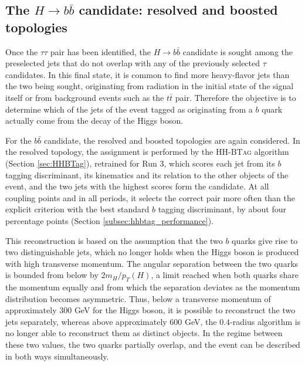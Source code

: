 
\subsection{The \texorpdfstring{$H\to b\bar{b}$}{H->bb} candidate: resolved and boosted topologies}
%
Once the $\tau\tau$ pair has been identified, the $H\to b\bar{b}$ candidate is sought among the preselected jets that do not overlap with any of the previously selected $\tau$ candidates. In this final state, it is common to find more heavy-flavor jets than the two being sought, originating from radiation in the initial state of the signal itself or from background events such as the $t\bar{t}$ pair. Therefore the objective is to determine which of the jets of the event tagged as originating from a $b$ quark actually come from the decay of the Higgs boson.\medskip

For the $b\bar{b}$ candidate, the resolved and boosted topologies are again considered. In the resolved topology, the assignment is performed by the \textsc{HH-BTag} algorithm (Section \ref{sec:HHBTag}), retrained for Run 3, which scores each jet from its $b$ tagging discriminant, its kinematics and its relation to the other objects of the event, and the two jets with the highest scores form the candidate. At all coupling points and in all periods, it selects the correct pair more often than the explicit criterion with the best standard $b$ tagging discriminant, by about four percentage points (Section \ref{subsec:hhbtag_performance}).

This reconstruction is based on the assumption that the two $b$ quarks give rise to two distinguishable jets, which no longer holds when the Higgs boson is produced with high transverse momentum. The angular separation between the two quarks is bounded from below by $2 m_{H} / p_{T}(H)$, a limit reached when both quarks share the momentum equally and from which the separation deviates as the momentum distribution becomes asymmetric. Thus, below a transverse momentum of approximately $300$ GeV for the Higgs boson, it is possible to reconstruct the two jets separately, whereas above approximately $600$ GeV, the $0.4$-radius algorithm is no longer able to reconstruct them as distinct objects. In the regime between these two values, the two quarks partially overlap, and the event can be described in both ways simultaneously.

